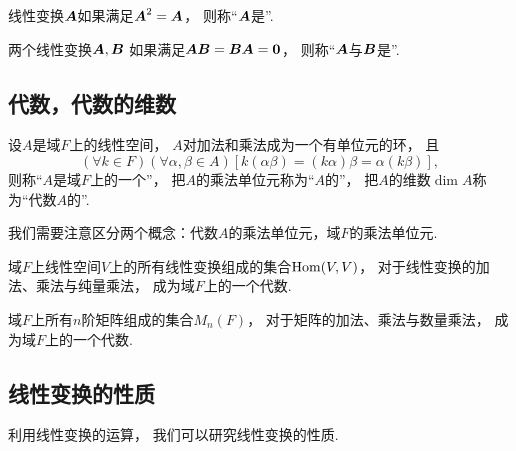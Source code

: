 \begin{definition}
线性变换\(\boldsymbol{A}\)如果满足\(\boldsymbol{A}^2=\boldsymbol{A}\)，
则称“\(\boldsymbol{A}\)是”.
\end{definition}

\begin{definition}
两个线性变换\(\boldsymbol{A},\boldsymbol{B}\)
如果满足\(\boldsymbol{A} \boldsymbol{B}=\boldsymbol{B} \boldsymbol{A}=\boldsymbol0\)，
则称“\(\boldsymbol{A}\)与\(\boldsymbol{B}\)是”.
\end{definition}

\subsection{代数，代数的维数}
\begin{definition}
设\(A\)是域\(F\)上的线性空间，
\(A\)对加法和乘法成为一个有单位元的环，
且\begin{equation*}
	(\forall k\in F)
	(\forall\alpha,\beta\in A)
	[
		k(\alpha\beta)
		=(k\alpha)\beta
		=\alpha(k\beta)
	],
\end{equation*}
则称“\(A\)是域\(F\)上的一个”，
把\(A\)的乘法单位元称为“\(A\)的”，
把\(A\)的维数\(\dim A\)称为“代数\(A\)的”.
\end{definition}
\begin{remark}
我们需要注意区分两个概念：代数\(A\)的乘法单位元，域\(F\)的乘法单位元.
\end{remark}

\begin{example}
域\(F\)上线性空间\(V\)上的所有线性变换组成的集合\(\operatorname{Hom}(V,V)\)，
对于线性变换的加法、乘法与纯量乘法，
成为域\(F\)上的一个代数.
\end{example}

\begin{example}
域\(F\)上所有\(n\)阶矩阵组成的集合\(M_n(F)\)，
对于矩阵的加法、乘法与数量乘法，
成为域\(F\)上的一个代数.
\end{example}

\subsection{线性变换的性质}
利用线性变换的运算，
我们可以研究线性变换的性质.

